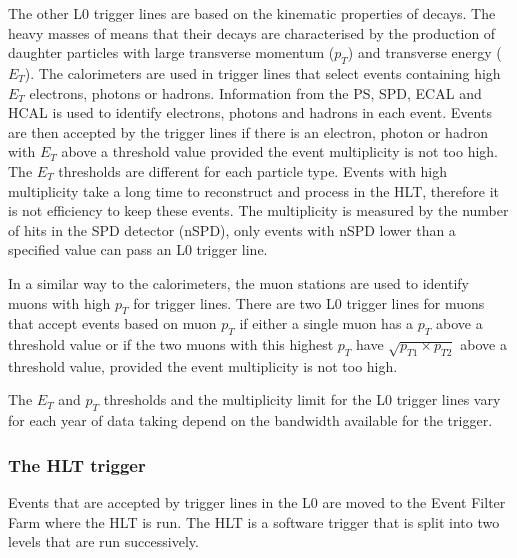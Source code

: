 The other L0 trigger lines are based on the kinematic properties of \bhadron decays. The heavy masses of \bhadrons means that their decays are characterised by the production of daughter particles with large transverse momentum ($p_{T}$) and transverse energy ($E_{T}$).
The calorimeters are used in trigger lines that select events containing high $E_{T}$ electrons, photons or hadrons. Information from the PS, SPD, ECAL and HCAL is used to identify electrons, photons and hadrons in each event. Events are then accepted by the trigger lines if there is an electron, photon or hadron with $E_{T}$ above a threshold value provided the event multiplicity is not too high. The $E_{T}$ thresholds are different for each particle type. Events with high multiplicity take a long time to reconstruct and process in the HLT, therefore it is not efficiency to keep these events. The multiplicity is measured by the number of hits in the SPD detector (nSPD), only events with nSPD lower than a specified value can pass an L0 trigger line. 


In a similar way to the calorimeters, the muon stations are used to identify muons with high $p_{T}$ for trigger lines. There are two L0 trigger lines for muons that accept events based on muon $p_{T}$ if either a single muon has a $p_{T}$ above a threshold value or if the two muons with this highest $p_{T}$ have $\sqrt{p_{T1} \times p_{T2}}$ above a threshold value, provided the event multiplicity is not too high. %

The $E_{T}$ and $p_{T}$ thresholds and the multiplicity limit for the L0 trigger lines vary for each year of data taking depend on the bandwidth available for the trigger. %


\subsubsection{The HLT trigger}
\label{HLT}

Events that are accepted by trigger lines in the L0 are moved to the Event Filter Farm where the HLT is run. The HLT is a software trigger that is split into two levels that are run successively. 


